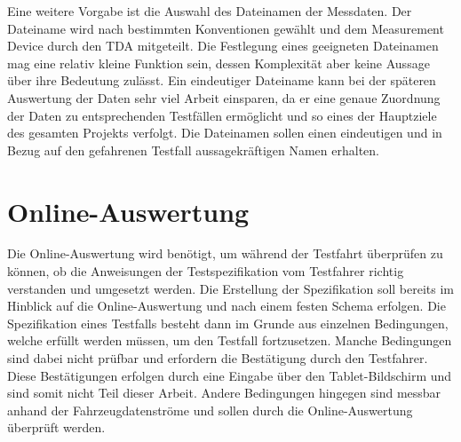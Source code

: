 \documentclass[12pt,a4paper]{report}
\begin{document}
Eine weitere Vorgabe ist die Auswahl des Dateinamen der Messdaten. Der Dateiname wird nach bestimmten Konventionen gewählt und dem Measurement Device durch den TDA mitgeteilt. Die Festlegung eines geeigneten Dateinamen mag eine relativ kleine Funktion sein, dessen Komplexität aber keine Aussage über ihre Bedeutung zulässt. Ein eindeutiger Dateiname kann bei der späteren Auswertung der Daten sehr viel Arbeit einsparen, da er eine genaue Zuordnung der Daten zu entsprechenden Testfällen ermöglicht und so eines der Hauptziele des gesamten Projekts verfolgt. Die Dateinamen sollen einen eindeutigen und in Bezug auf den gefahrenen Testfall aussagekräftigen Namen erhalten.
\section{Online-Auswertung}\label{sec:Online-Auswertung}
Die Online-Auswertung wird benötigt, um während der Testfahrt überprüfen zu können, ob die Anweisungen der Testspezifikation vom Testfahrer richtig verstanden und umgesetzt werden. Die Erstellung der Spezifikation soll bereits im Hinblick auf die Online-Auswertung und nach einem festen Schema erfolgen. Die Spezifikation eines Testfalls besteht dann im Grunde aus einzelnen Bedingungen, welche erfüllt werden müssen, um den Testfall fortzusetzen. Manche Bedingungen sind dabei nicht prüfbar und erfordern die Bestätigung durch den Testfahrer. Diese Bestätigungen erfolgen durch eine Eingabe über den Tablet-Bildschirm und sind somit nicht Teil dieser Arbeit. Andere Bedingungen hingegen sind messbar anhand der Fahrzeugdatenströme und sollen durch die Online-Auswertung überprüft werden.
\end{document}
